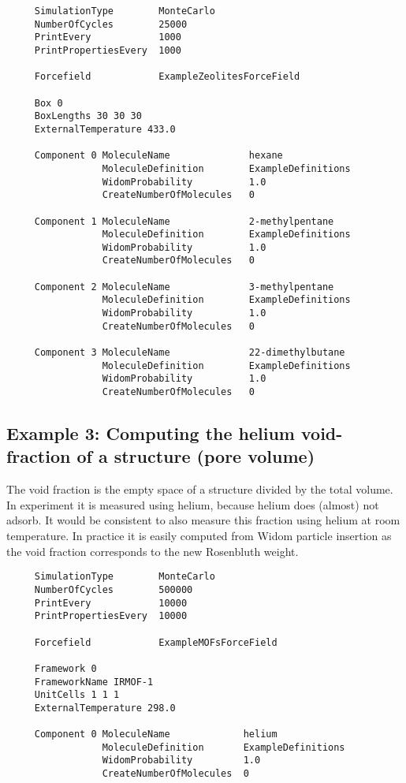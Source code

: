 \begin{tiny}
\begin{verbatim}
     SimulationType        MonteCarlo
     NumberOfCycles        25000
     PrintEvery            1000
     PrintPropertiesEvery  1000

     Forcefield            ExampleZeolitesForceField

     Box 0
     BoxLengths 30 30 30
     ExternalTemperature 433.0

     Component 0 MoleculeName              hexane
                 MoleculeDefinition        ExampleDefinitions
                 WidomProbability          1.0
                 CreateNumberOfMolecules   0

     Component 1 MoleculeName              2-methylpentane
                 MoleculeDefinition        ExampleDefinitions
                 WidomProbability          1.0
                 CreateNumberOfMolecules   0

     Component 2 MoleculeName              3-methylpentane
                 MoleculeDefinition        ExampleDefinitions
                 WidomProbability          1.0
                 CreateNumberOfMolecules   0

     Component 3 MoleculeName              22-dimethylbutane
                 MoleculeDefinition        ExampleDefinitions
                 WidomProbability          1.0
                 CreateNumberOfMolecules   0
\end{verbatim}
\end{tiny}

\subsection*{Example 3: Computing the helium void-fraction of a structure (pore volume)}

The void fraction is the empty space of a structure divided by the total volume. In experiment it
is measured using helium, because helium does (almost) not adsorb. It would be consistent to also
measure this fraction using helium at room temperature. In practice it is easily computed from
Widom particle insertion as the void fraction corresponds to the new Rosenbluth weight.
\begin{tiny}
\begin{verbatim}
     SimulationType        MonteCarlo
     NumberOfCycles        500000
     PrintEvery            10000
     PrintPropertiesEvery  10000

     Forcefield            ExampleMOFsForceField

     Framework 0
     FrameworkName IRMOF-1
     UnitCells 1 1 1
     ExternalTemperature 298.0

     Component 0 MoleculeName             helium
                 MoleculeDefinition       ExampleDefinitions
                 WidomProbability         1.0
                 CreateNumberOfMolecules  0
\end{verbatim}
\end{tiny}

